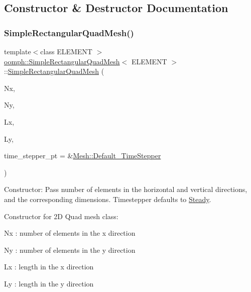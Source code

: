 \subsection{Constructor \& Destructor Documentation}
\mbox{\label{classoomph_1_1SimpleRectangularQuadMesh_a8224b55f7d99a36debacb3f4cc293407}} 
\subsubsection{\texorpdfstring{Simple\+Rectangular\+Quad\+Mesh()}{SimpleRectangularQuadMesh()}}
{\footnotesize\ttfamily template$<$class E\+L\+E\+M\+E\+NT $>$ \\
\hyperlink{classoomph_1_1SimpleRectangularQuadMesh}{oomph\+::\+Simple\+Rectangular\+Quad\+Mesh}$<$ E\+L\+E\+M\+E\+NT $>$\+::\hyperlink{classoomph_1_1SimpleRectangularQuadMesh}{Simple\+Rectangular\+Quad\+Mesh} (\begin{DoxyParamCaption}\item[{const unsigned \&}]{Nx,  }\item[{const unsigned \&}]{Ny,  }\item[{const double \&}]{Lx,  }\item[{const double \&}]{Ly,  }\item[{\hyperlink{classoomph_1_1TimeStepper}{Time\+Stepper} $\ast$}]{time\+\_\+stepper\+\_\+pt = {\ttfamily \&\hyperlink{classoomph_1_1Mesh_a12243d0fee2b1fcee729ee5a4777ea10}{Mesh\+::\+Default\+\_\+\+Time\+Stepper}} }\end{DoxyParamCaption})}



Constructor\+: Pass number of elements in the horizontal and vertical directions, and the corresponding dimensions. Timestepper defaults to \hyperlink{classoomph_1_1Steady}{Steady}. 

Constructor for 2D Quad mesh class\+:

Nx \+: number of elements in the x direction

Ny \+: number of elements in the y direction

Lx \+: length in the x direction

Ly \+: length in the y direction

